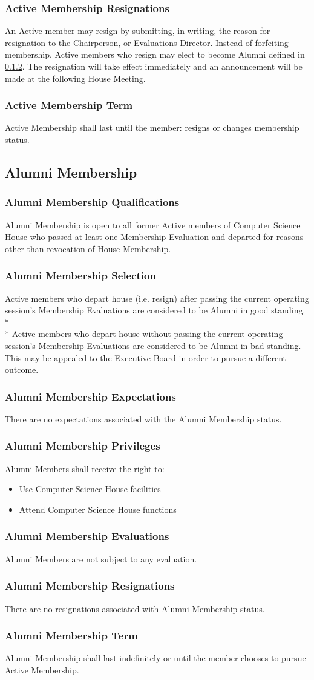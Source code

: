 \documentclass{article}
\newcommand{\asection}[1]{\subsection{#1} \label{#1}}
\newcommand{\asubsection}[1]{\subsubsection{#1} \label{#1}}
\begin{document}
\asubsection{Active Membership Resignations}
An Active member may resign by submitting, in writing, the reason for resignation to the Chairperson, or Evaluations Director.
Instead of forfeiting membership, Active members who resign may elect to become Alumni defined in \ref{Alumni Membership Selection}.
The resignation will take effect immediately and an announcement will be made at the following House Meeting.
\asubsection{Active Membership Term}
Active Membership shall last until the member: resigns or changes membership status.

\asection{Alumni Membership}
\asubsection{Alumni Membership Qualifications}
Alumni Membership is open to all former Active members of Computer Science House who passed at least one Membership Evaluation and departed for reasons other than revocation of House Membership.
\asubsection{Alumni Membership Selection}
Active members who depart house (i.e. resign) after passing the current operating session's Membership Evaluations are considered to be Alumni in good standing.
\\*\\*
Active members who depart house without passing the current operating session's Membership Evaluations are considered to be Alumni in bad standing.
This may be appealed to the Executive Board in order to pursue a different outcome.
\asubsection{Alumni Membership Expectations}
There are no expectations associated with the Alumni Membership status.
\asubsection{Alumni Membership Privileges}
Alumni Members shall receive the right to:
\begin{itemize}
	\item Use Computer Science House facilities
	\item Attend Computer Science House functions
\end{itemize}
\asubsection{Alumni Membership Evaluations}
Alumni Members are not subject to any evaluation.
\asubsection{Alumni Membership Resignations}
There are no resignations associated with Alumni Membership status.
\asubsection{Alumni Membership Term}
Alumni Membership shall last indefinitely or until the member chooses to pursue Active Membership.
\end{document}
